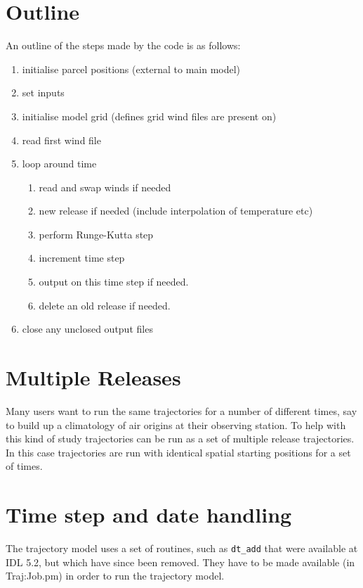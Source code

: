 \documentclass[a4paper]{article}
\begin{document}
\section{Outline}
An outline of the steps made by the code is as follows:

\begin{enumerate}
\item initialise parcel positions (external to main model)
\item set inputs
\item initialise model grid (defines grid wind files are present on)
\item read first wind file
\item loop around time
\begin{enumerate}
\item read and swap winds if needed
\item new release if needed (include interpolation of temperature etc)
\item perform Runge-Kutta step
\item increment time step
\item output on this time step if needed.
\item delete an old release if needed.
\end{enumerate}
\item close any unclosed output files
\end{enumerate}

\section{Multiple Releases}
Many users want to run the same trajectories for a number of different
times, say to build up a climatology of air origins at their observing
station.  To help with this kind of study trajectories can be run as a
set of multiple release trajectories.  In this case trajectories are
run with identical spatial starting positions for a set of times.

\section{Time step and date handling}
The trajectory model uses a set of routines, such as {\tt dt\_add}
that  were available at IDL 5.2, but which have since been
removed.  They have to be made available (in Traj:Job.pm) in order to
run the trajectory model.
\end{document}
